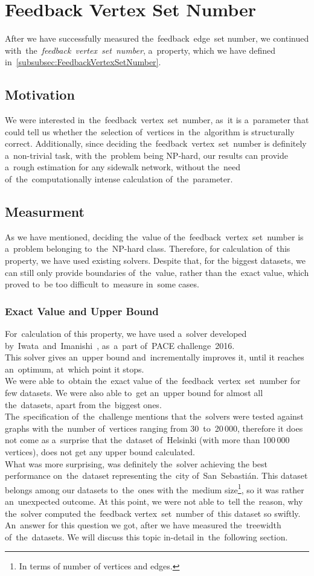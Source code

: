 \section{Feedback Vertex Set Number}
After we have successfully measured the~feedback~edge~set number, we continued with~the~\textit{feedback~vertex~set~number},  a~property, which we have defined in~\autoref{subsubsec:FeedbackVertexSetNumber}.
\subsection{Motivation}
We were interested in~the~feedback~vertex~set~number, as~it is a~parameter that could tell us whether the~selection of~vertices in~the~algorithm is structurally correct. Additionally, since deciding the~feedback~vertex~set~number is definitely a~non-trivial task, with the~problem being NP-hard, our results can provide a~rough estimation for any sidewalk network, without the~need of~the~computationally intense calculation of~the~parameter.
\subsection{Measurment}
As we have mentioned, deciding the~value of the~feedback~vertex~set~number is a~problem belonging to~the~NP-hard class. Therefore, for calculation of~this property, we have used existing solvers. Despite that, for the biggest datasets, we can still only provide boundaries of~the~value, rather than the~exact value, which proved to~be too difficult to~measure in~some cases.
\subsubsection{Exact Value and Upper Bound}
For~calculation of this property, we have used a~solver developed by~Iwata~and~Imanishi~\cite{Iwata1, Iwata2}, as~a~part of~PACE challenge~2016. \\
This solver gives an~upper bound and~incrementally improves it, until it reaches an~optimum, at~which point it stops.\\
We were able to~obtain the~exact value of~the~feedback~vertex~set~number for few datasets. We were also able to~get an~upper bound for almost all the~datasets, apart from the~biggest ones. \\
The~specification of~the~challenge mentions that the~solvers were tested against graphs with the~number of~vertices ranging from 30~to~20\,000, therefore it does not come as a~surprise that the~dataset of~Helsinki (with more than 100\,000 vertices), does not get any upper bound calculated. \\
What was more surprising, was definitely the~solver achieving the best performance on~the~dataset representing the~city of~San~Sebastián. This dataset belongs among our datasets to~the~ones with the~medium size\footnote{In terms of number of vertices and edges.}, so it was rather an~unexpected outcome. At this point, we were not able to~tell the~reason, why the~solver computed the~feedback vertex~set~number of~this dataset so swiftly. An~answer for this question we got, after we have measured the~treewidth of~the~datasets. We will discuss this topic in-detail in~the~following section.
